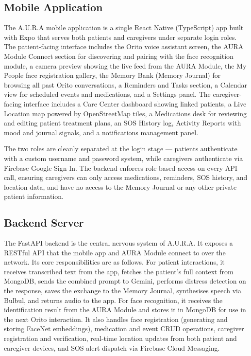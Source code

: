 \subsection{Mobile Application}
The A.U.R.A mobile application is a single React Native (TypeScript) app built with Expo that serves both patients and caregivers under separate login roles. The patient-facing interface includes the Orito voice assistant screen, the AURA Module Connect section for discovering and pairing with the face recognition module, a camera preview showing the live feed from the AURA Module, the My People face registration gallery, the Memory Bank (Memory Journal) for browsing all past Orito conversations, a Reminders and Tasks section, a Calendar view for scheduled events and medications, and a Settings panel. The caregiver-facing interface includes a Care Center dashboard showing linked patients, a Live Location map powered by OpenStreetMap tiles, a Medications desk for reviewing and editing patient treatment plans, an SOS History log, Activity Reports with mood and journal signals, and a notifications management panel.

The two roles are cleanly separated at the login stage --- patients authenticate with a custom username and password system, while caregivers authenticate via Firebase Google Sign-In. The backend enforces role-based access on every API call, ensuring caregivers can only access medications, reminders, SOS history, and location data, and have no access to the Memory Journal or any other private patient information.

\subsection{Backend Server}
The FastAPI backend is the central nervous system of A.U.R.A. It exposes a RESTful API that the mobile app and AURA Module connect to over the network. Its core responsibilities are as follows. For patient interactions, it receives transcribed text from the app, fetches the patient's full context from MongoDB, sends the combined prompt to Gemini, performs distress detection on the response, saves the exchange to the Memory Journal, synthesises speech via Bulbul, and returns audio to the app. For face recognition, it receives the identification result from the AURA Module and stores it in MongoDB for use in the next Orito interaction. It also handles face registration (generating and storing FaceNet embeddings), medication and event CRUD operations, caregiver registration and verification, real-time location updates from both patient and caregiver devices, and SOS alert dispatch via Firebase Cloud Messaging.

